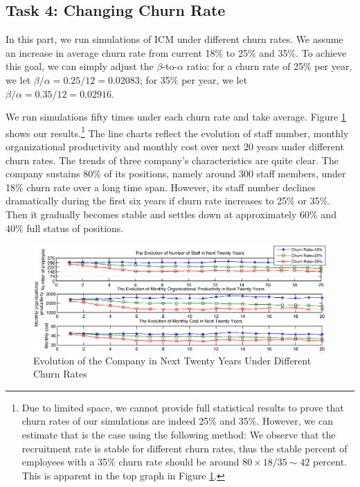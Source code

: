 \documentclass[tcn = 37075, sheet = false, abstract = false]{mcmthesis}
\begin{document}
\subsection{Task 4: Changing Churn Rate}

In this part, we run simulations of ICM under different churn rates. We assume an increase in average churn rate from current 18\% to 25\% and 35\%. To achieve this goal, we can simply adjust the $\beta$-to-$\alpha$ ratio: for a churn rate of 25\% per year, we let $\beta/\alpha = 0.25/12 = 0.02083$; for 35\% per year, we let $\beta/\alpha = 0.35/12 = 0.02916$.

We run simulations fifty times under each churn rate and take average.  Figure \ref{fig:churn} shows our results.\footnote{Due to limited space, we cannot provide full statistical results to prove that churn rates of our simulations are indeed 25\% and 35\%. However, we can estimate that is the case using the following method: We observe that the recruitment rate is stable for different churn rates, thus the stable percent of employees with a 35\% churn rate should be around $80 \times 18 / 35 \sim 42$ percent. This is apparent in the top graph in Figure \ref{fig:churn}.} The line charts reflect the evolution of staff number, monthly organizational productivity and monthly cost over next 20 years under different churn rates. The trends of three company's characteristics are quite clear. The company sustains 80\% of its positions, namely around 300 staff members, under 18\% churn rate over a long time span. However, its staff number declines dramatically during the first six years if churn rate increases to 25\% or 35\%. Then it gradually becomes stable and settles down at approximately 60\% and 40\% full status of positions.


\begin{figure}[htb!]
\centering
\includegraphics[width=16cm]{figures/Task4_1.eps}
\caption{Evolution of the Company in Next Twenty Years Under Different Churn Rates} 
\label{fig:churn}
\end{figure}
\end{document}
